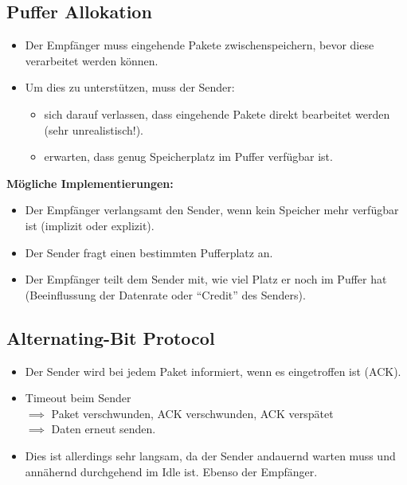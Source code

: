 \documentclass[a4paper, 11pt, accentcolor = tud3b]{tudreport}
\begin{document}
            \subsection{Puffer Allokation}
                \begin{itemize}
                	\item Der Empfänger muss eingehende Pakete zwischenspeichern, bevor diese verarbeitet werden können.
                	\item Um dies zu unterstützen, muss der Sender:
	                	\begin{itemize}
	                		\item sich darauf verlassen, dass eingehende Pakete direkt bearbeitet werden (sehr unrealistisch!).
	                		\item erwarten, dass genug Speicherplatz im Puffer verfügbar ist.
	                	\end{itemize}
                \end{itemize}
                
                \textbf{Mögliche Implementierungen:}
                \begin{itemize}
                	\item Der Empfänger verlangsamt den Sender, wenn kein Speicher mehr verfügbar ist (implizit oder explizit).
                	\item Der Sender fragt einen bestimmten Pufferplatz an.
                	\item Der Empfänger teilt dem Sender mit, wie viel Platz er noch im Puffer hat (Beeinflussung der Datenrate oder \enquote{Credit} des Senders).
                \end{itemize}

            \subsection{Alternating-Bit Protocol}
	            \label{sec:abp}
            
                \begin{itemize}
                	\item Der Sender wird bei jedem Paket informiert, wenn es eingetroffen ist (ACK).
                	\item Timeout beim Sender \\ \(\implies\) Paket verschwunden, ACK verschwunden, ACK verspätet \\ \(\implies\) Daten erneut senden.
                	\item Dies ist allerdings sehr langsam, da der Sender andauernd warten muss und annähernd durchgehend im Idle ist. Ebenso der Empfänger.
                \end{itemize}
\end{document}

